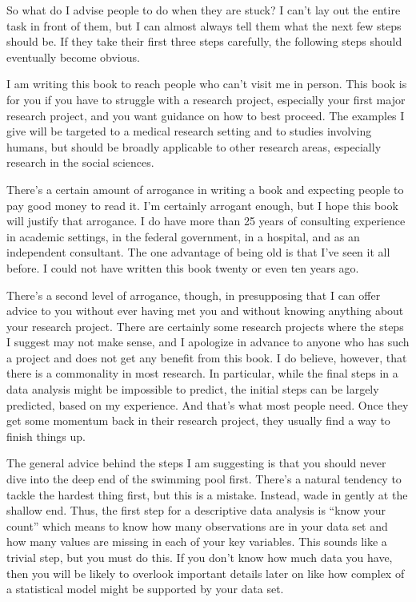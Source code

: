 \documentclass[
  letterpaper,
  DIV=11,
  numbers=noendperiod]{scrreprt}
\begin{document}
So what do I advise people to do when they are stuck? I can't lay out
the entire task in front of them, but I can almost always tell them what
the next few steps should be. If they take their first three steps
carefully, the following steps should eventually become obvious.

I am writing this book to reach people who can't visit me in person.
This book is for you if you have to struggle with a research project,
especially your first major research project, and you want guidance on
how to best proceed. The examples I give will be targeted to a medical
research setting and to studies involving humans, but should be broadly
applicable to other research areas, especially research in the social
sciences.

There's a certain amount of arrogance in writing a book and expecting
people to pay good money to read it. I'm certainly arrogant enough, but
I hope this book will justify that arrogance. I do have more than 25
years of consulting experience in academic settings, in the federal
government, in a hospital, and as an independent consultant. The one
advantage of being old is that I've seen it all before. I could not have
written this book twenty or even ten years ago.

There's a second level of arrogance, though, in presupposing that I can
offer advice to you without ever having met you and without knowing
anything about your research project. There are certainly some research
projects where the steps I suggest may not make sense, and I apologize
in advance to anyone who has such a project and does not get any benefit
from this book. I do believe, however, that there is a commonality in
most research. In particular, while the final steps in a data analysis
might be impossible to predict, the initial steps can be largely
predicted, based on my experience. And that's what most people need.
Once they get some momentum back in their research project, they usually
find a way to finish things up.

The general advice behind the steps I am suggesting is that you should
never dive into the deep end of the swimming pool first. There's a
natural tendency to tackle the hardest thing first, but this is a
mistake. Instead, wade in gently at the shallow end. Thus, the first
step for a descriptive data analysis is ``know your count'' which means
to know how many observations are in your data set and how many values
are missing in each of your key variables. This sounds like a trivial
step, but you must do this. If you don't know how much data you have,
then you will be likely to overlook important details later on like how
complex of a statistical model might be supported by your data set.
\end{document}
